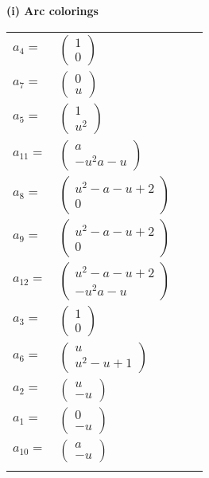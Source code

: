 \documentclass[1p]{elsarticle_modified}
\theoremstyle{definition}
\begin{document}
\flushleft \textbf{(i) Arc colorings}\\
\begin{tabular}{m{7pt} m{180pt} m{7pt} m{180pt} }
\flushright $a_{4}=$&$\begin{pmatrix}1\\0\end{pmatrix}$ \\
\flushright $a_{7}=$&$\begin{pmatrix}0\\u\end{pmatrix}$ \\
\flushright $a_{5}=$&$\begin{pmatrix}1\\u^2\end{pmatrix}$ \\
\flushright $a_{11}=$&$\begin{pmatrix}a\\- u^2 a- u\end{pmatrix}$ \\
\flushright $a_{8}=$&$\begin{pmatrix}u^2- a- u+2\\0\end{pmatrix}$ \\
\flushright $a_{9}=$&$\begin{pmatrix}u^2- a- u+2\\0\end{pmatrix}$ \\
\flushright $a_{12}=$&$\begin{pmatrix}u^2- a- u+2\\- u^2 a- u\end{pmatrix}$ \\
\flushright $a_{3}=$&$\begin{pmatrix}1\\0\end{pmatrix}$ \\
\flushright $a_{6}=$&$\begin{pmatrix}u\\u^2- u+1\end{pmatrix}$ \\
\flushright $a_{2}=$&$\begin{pmatrix}u\\- u\end{pmatrix}$ \\
\flushright $a_{1}=$&$\begin{pmatrix}0\\- u\end{pmatrix}$ \\
\flushright $a_{10}=$&$\begin{pmatrix}a\\- u\end{pmatrix}$\\&\end{tabular}
\end{document}
